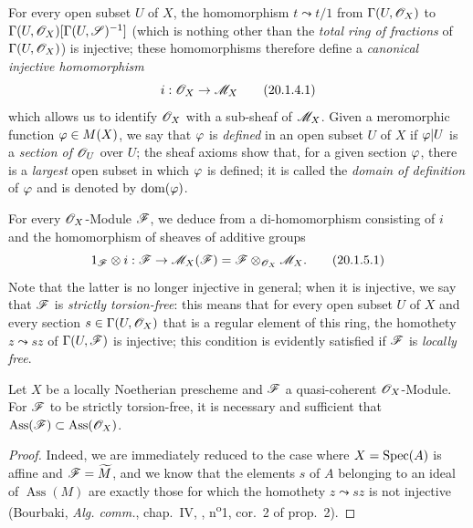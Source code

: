\begin{env}[20.1.4]\label{IV.20.1.4}
For every open subset $U$ of $X$, the homomorphism $t\leadsto t/1$ from $\Gamma(U,\mathscr{O}_X)$ to $\Gamma(U,\mathscr{O}_X)[\Gamma(U,\mathscr{S})^{-1}]$ (which is nothing other than the \emph{total ring of fractions} of
$\Gamma(U,\mathscr{O}_X)$) is injective; these homomorphisms therefore define a \emph{canonical injective homomorphism}
\[
\label{IV.20.1.4.1}
  i:\mathscr{O}_X\to\mathscr{M}_X
  \tag{20.1.4.1}
\]
which allows us to identify $\mathscr{O}_X$ with a sub-sheaf of $\mathscr{M}_X$.
Given a meromorphic function $\varphi\in M(X)$, we say that $\varphi$ is \emph{defined} in an open subset $U$ of $X$ if $\varphi|U$ is a \emph{section of $\mathscr{O}_U$} over $U$; the sheaf axioms show that, for a given section $\varphi$, there is a \emph{largest} open subset in which $\varphi$ is defined; it is called the \emph{domain of definition} of $\varphi$ and is denoted by $\operatorname{dom}(\varphi)$.
\end{env}

\begin{env}[20.1.5]\label{IV.20.1.5}
For every $\mathscr{O}_X$-Module $\mathscr{F}$, we deduce from  a di-homomorphism consisting of $i$ and the homomorphism of sheaves of additive groups
\[
\label{IV.20.1.5.1}
  1_{\mathscr{F}}\otimes i:\mathscr{F}\to\mathscr{M}_X(\mathscr{F})=\mathscr{F}\otimes_{\mathscr{O}_X}\mathscr{M}_X.
  \tag{20.1.5.1}
\]
Note that the latter is no longer injective in general; when it is injective, we say that $\mathscr{F}$ is \emph{strictly torsion-free}: this means that for every open subset $U$ of $X$ and every section $s\in\Gamma(U,\mathscr{O}_X)$ that is a regular element of this ring, the homothety $z\leadsto sz$ of $\Gamma(U,\mathscr{F})$ is injective; this condition is evidently satisfied if $\mathscr{F}$ is \emph{locally free}.
\end{env}

\begin{proposition}[20.1.6]
\label{IV.20.1.6}
Let $X$ be a locally Noetherian prescheme and $\mathscr{F}$ a quasi-coherent $\mathscr{O}_X$-Module.
For $\mathscr{F}$ to be strictly torsion-free, it is necessary and sufficient that $\operatorname{Ass}(\mathscr{F})\subset\operatorname{Ass}(\mathscr{O}_X)$.
\end{proposition}

\begin{proof}
Indeed, we are immediately reduced to the case where $X=\operatorname{Spec}(A)$ is affine and $\mathscr{F}=\widetilde M$, and we know that the elements $s$ of $A$ belonging to an ideal of $\operatorname{Ass}(M)$ are exactly those for which the homothety $z\leadsto sz$ is not injective (Bourbaki, \emph{Alg. comm.}, chap.~IV, , n\textsuperscript{o}1, cor.~2 of prop.~2).
\end{proof}


